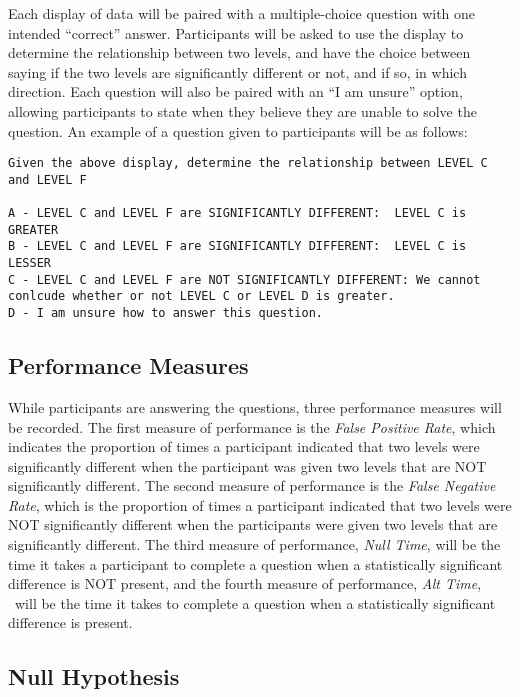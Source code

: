 \documentclass{article}
\begin{document}
Each display of data will be paired with a multiple-choice question with one intended ``correct'' answer. Participants will be asked to use the display to determine the relationship between two levels, and have the choice between saying if the two levels are significantly different or not, and if so, in which direction. Each question will also be paired with an ``I am unsure'' option, allowing participants to state when they believe they are unable to solve the question. An example of a question given to participants will be as follows:

\begin{lstlisting}
Given the above display, determine the relationship between LEVEL C and LEVEL F 

A - LEVEL C and LEVEL F are SIGNIFICANTLY DIFFERENT:  LEVEL C is GREATER
B - LEVEL C and LEVEL F are SIGNIFICANTLY DIFFERENT:  LEVEL C is LESSER
C - LEVEL C and LEVEL F are NOT SIGNIFICANTLY DIFFERENT: We cannot conlcude whether or not LEVEL C or LEVEL D is greater.
D - I am unsure how to answer this question. 
\end{lstlisting}

\subsection{Performance Measures}

While participants are answering the questions, three performance measures will be recorded. The first measure of performance is the \emph{False Positive Rate}, which indicates the proportion of times a participant indicated that two levels were significantly different when the participant was given two levels that are NOT significantly different. The second measure of performance is the \emph{False Negative Rate}, which is the proportion of times a participant indicated that two levels were NOT significantly different when the participants were given two levels that are significantly different. The third measure of performance, \emph{Null Time}, will be the time it takes a participant to complete a question when a statistically significant difference is NOT present, and the fourth measure of performance, \emph{Alt Time},  will be the time it takes to complete a question when a statistically significant difference is present.

\subsection{Null Hypothesis}
\end{document}

